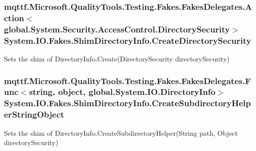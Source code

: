 \hypertarget{class_system_1_1_i_o_1_1_fakes_1_1_shim_directory_info_ad7279d80b38c229bc09ab4c10b5c8f58}{
\subsubsection[{Create\-Directory\-Security}]{\setlength{\rightskip}{0pt plus 5cm}mqttf.\-Microsoft.\-Quality\-Tools.\-Testing.\-Fakes.\-Fakes\-Delegates.\-Action$<$global.\-System.\-Security.\-Access\-Control.\-Directory\-Security$>$ System.\-I\-O.\-Fakes.\-Shim\-Directory\-Info.\-Create\-Directory\-Security\hspace{0.3cm}{\ttfamily [set]}}}\label{class_system_1_1_i_o_1_1_fakes_1_1_shim_directory_info_ad7279d80b38c229bc09ab4c10b5c8f58}


Sets the shim of Directory\-Info.\-Create(\-Directory\-Security directory\-Security)

\hypertarget{class_system_1_1_i_o_1_1_fakes_1_1_shim_directory_info_a049fe4eb275cab9150a3c9499647a3a3}{
\subsubsection[{Create\-Subdirectory\-Helper\-String\-Object}]{\setlength{\rightskip}{0pt plus 5cm}mqttf.\-Microsoft.\-Quality\-Tools.\-Testing.\-Fakes.\-Fakes\-Delegates.\-Func$<$string, object, global.\-System.\-I\-O.\-Directory\-Info$>$ System.\-I\-O.\-Fakes.\-Shim\-Directory\-Info.\-Create\-Subdirectory\-Helper\-String\-Object\hspace{0.3cm}{\ttfamily [set]}}}\label{class_system_1_1_i_o_1_1_fakes_1_1_shim_directory_info_a049fe4eb275cab9150a3c9499647a3a3}


Sets the shim of Directory\-Info.\-Create\-Subdirectory\-Helper(\-String path, Object directory\-Security)

